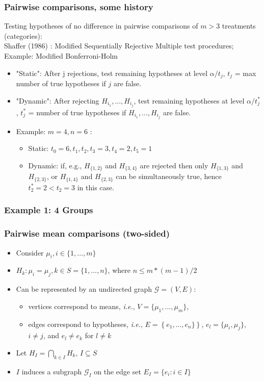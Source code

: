\documentclass[bigger]{beamer}
\begin{document}
\begin{frame}
\frametitle{Pairwise comparisons, some history}

Testing hypotheses of no difference in pairwise comparisons of $m>3$ treatments (categories):\\
Shaffer (1986) : Modified Sequentially Rejective Multiple test procedures; Example: Modified Bonferroni-Holm
\begin{itemize}
  \item "Static":  After j rejections, test remaining hypotheses at level $\alpha/t_j$, $t_j$ = max number of true hypotheses if $j$ are false.
  \item "Dynamic": After rejecting $H_{i_1},...,H_{i_j}$, test remaining hypotheses at level $\alpha/t^*_j$,  $t^*_j$ = number of true hypotheses if $H_{i_1},...,H_{i_j}$ are false.
  \item Example: $m=4, n=6$ :
    \begin{itemize}
      \item Static: $t_0=6, t_1,t_2,t_3 = 3, t_4=2, t_5=1$
      \item Dynamic: if, e.g., $H_{\{1,2\}}$ and $H_{\{3,4\}}$ are rejected then only $H_{\{1,3\}}$ and $H_{\{2,3\}}$, or $H_{\{1,4\}}$ and $H_{\{2,3\}}$ can be simultaneously true, hence $t^*_2 = 2 < t_2 =3$ in this case.
       \end{itemize}
\end{itemize}
\end{frame}


\begin{frame}
\frametitle{Example 1: 4 Groups}

\end{frame}


\begin{frame}
\frametitle{Pairwise mean comparisons (two-sided)}
\begin{itemize}

\item Consider $\mu_i, i \in \{1,...,m\}$

\item $H_k: \mu_i = \mu_j, k \in S = \{1,...,n\}$, where $n \leq m*(m-1)/2$

\item Can be represented by an undirected graph $\mathscr{G} = (V,E)$:
\begin{itemize}
\item vertices correspond to means, \emph{i.e.}, $V = \{\mu_1,...,\mu_m\}$,
\item edges correspond to hypotheses, \emph{i.e.}, $E =
      \left\{e_1,...,e_n\} \right\}$, $e_l = \{\mu_i,\mu_j\}$, $i \neq
      j$, and $e_l \neq e_k$ for $l \neq k$
\end{itemize}
\item Let $H_I = \bigcap_{k \in I} H_k$, $I \subseteq S$
\item $I$ induces a subgraph $\mathscr{G}_I$ on the edge set $E_I=\{e_i: i
  \in I\}$
\end{itemize} %
\end{frame}
\end{document}

